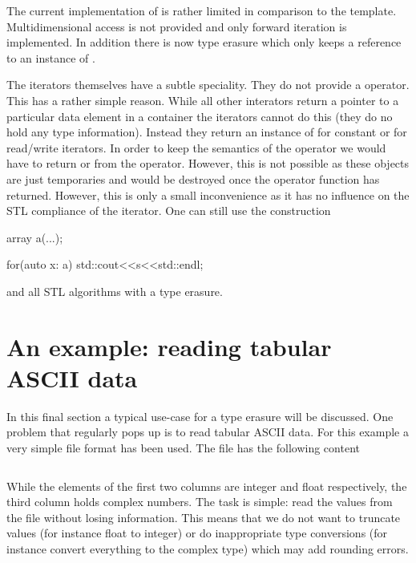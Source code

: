 The current implementation of  is rather limited in comparison 
to the  template. Multidimensional access is not provided and only
forward iteration is implemented. In addition there is now  
type erasure which only keeps a reference to an instance of . 

The iterators themselves have a subtle speciality. They do not provide a
\cpp{->} operator. This has a rather simple reason. While all other interators
return a pointer to a particular data element in a container the 
iterators cannot do this (they do no hold any type information). Instead they
return an instance of  for constant or  for
read/write iterators. In order to keep the semantics of the \cpp{->} operator we
would have to return  or  from the \cpp{->}
operator. However, this is not possible as these objects are just temporaries
and would be destroyed once the operator function has returned. 
However, this is only a small inconvenience as it has no influence on the 
STL compliance of the iterator. 
One can still use the  construction
\begin{cppcode}
array a(...);

for(auto x: a)
    std::cout<<s<<std::endl;
\end{cppcode}
and all STL algorithms with a  type erasure.


\section{An example: reading tabular ASCII data}

In this final section a typical use-case for a type erasure will be discussed. 
One problem that regularly pops up is to read tabular ASCII data. 
For this example a very simple file format has been used. The file
has the following content
\inputminted[fontsize=\small,
             frame=lines,
             label=examples/record.dat]
{text}{../examples/record.dat}
While the elements of the first two columns are integer and float respectively,
the third column holds complex numbers. The task is simple: read the values from
the file without losing information. This means that we do not want to truncate
values (for instance float to integer) or do inappropriate type conversions (for
instance convert everything to the complex type) which may add rounding errors. 

